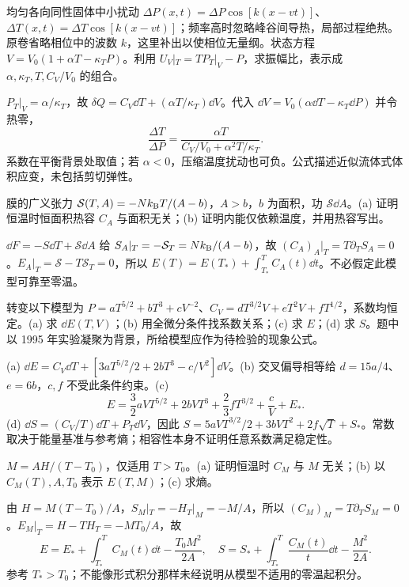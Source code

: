 \begin{exercise}
均匀各向同性固体中小扰动 $\Delta P(x,t)=\Delta P\cos[k(x-vt)]$、$\Delta T(x,t)=\Delta T\cos[k(x-vt)]$；频率高时忽略峰谷间导热，局部过程绝热。原卷省略相位中的波数 $k$，这里补出以使相位无量纲。状态方程 $V=V_0(1+\alpha T-\kappa_TP)$。利用 $U_V|_T=T P_T|_V-P$，求振幅比，表示成 $\alpha,\kappa_T,T,C_V/V_0$ 的组合。
\end{exercise}
\begin{solution}
$P_T|_V=\alpha/\kappa_T$，故 $\delta Q=C_V\dd T+(\alpha T/\kappa_T)\dd V$。代入 $\dd V=V_0(\alpha\dd T-\kappa_T\dd P)$ 并令热零，
\[\frac{\Delta T}{\Delta P}=\frac{\alpha T}{C_V/V_0+\alpha^2T/\kappa_T}.\]
系数在平衡背景处取值；若 $\alpha<0$，压缩温度扰动也可负。公式描述近似流体式体积应变，未包括剪切弹性。
\end{solution}
\begin{exercise}
膜的广义张力 $\mathcal S(T,A)=-Nk_{\mathrm B} T/(A-b)$，$A>b$，$b$ 为面积，功 $\mathcal S\dd A$。(a) 证明恒温时恒面积热容 $C_A$ 与面积无关；(b) 证明内能仅依赖温度，并用热容写出。
\end{exercise}
\begin{solution}
$\dd F=-S\dd T+\mathcal S\dd A$ 给 $S_A|_T=-\mathcal S_T=Nk_{\mathrm B}/(A-b)$，故 $(C_A)_A|_T=T\partial_T S_A=0$。$E_A|_T=\mathcal S-T\mathcal S_T=0$，所以 $E(T)=E(T_*)+\int_{T_*}^T C_A(t)\dd t$。不必假定此模型可靠至零温。
\end{solution}
\begin{exercise}
转变以下模型为 $P=aT^{5/2}+bT^3+cV^{-2}$、$C_V=dT^{3/2}V+eT^2V+fT^{1/2}$，系数均恒定。(a) 求 $\dd E(T,V)$；(b) 用全微分条件找系数关系；(c) 求 $E$；(d) 求 $S$。题中以 1995 年实验凝聚为背景，所给模型应作为待检验的现象公式。
\end{exercise}
\begin{solution}
(a) $\dd E=C_V\dd T+[3aT^{5/2}/2+2bT^3-c/V^2]\dd V$。(b) 交叉偏导相等给 $d=15a/4$、$e=6b$，$c,f$ 不受此条件约束。(c)
\[E=\frac32aVT^{5/2}+2bVT^3+\frac23fT^{3/2}+\frac cV+E_* .\]
(d) $\dd S=(C_V/T)\dd T+P_T\dd V$，因此 $S=5aVT^{3/2}/2+3bVT^2+2f\sqrt T+S_*$。常数取决于能量基准与参考熵；相容性本身不证明任意系数满足稳定性。
\end{solution}
\begin{exercise}
$M=AH/(T-T_0)$，仅适用 $T>T_0$。(a) 证明恒温时 $C_M$ 与 $M$ 无关；(b) 以 $C_M(T),A,T_0$ 表示 $E(T,M)$；(c) 求熵。
\end{exercise}
\begin{solution}
由 $H=M(T-T_0)/A$，$S_M|_T=-H_T|_M=-M/A$，所以 $(C_M)_M=T\partial_T S_M=0$。$E_M|_T=H-TH_T=-MT_0/A$，故
\[E=E_*+\int_{T_*}^T C_M(t)\dd t-\frac{T_0M^2}{2A},\quad
S=S_*+\int_{T_*}^T\frac{C_M(t)}t\dd t-\frac{M^2}{2A}.\]
参考 $T_*>T_0$；不能像形式积分那样未经说明从模型不适用的零温起积分。
\end{solution}
